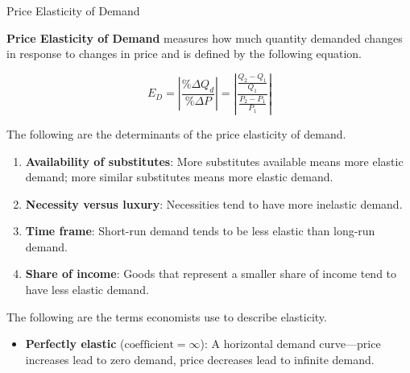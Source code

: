 \documentclass[10pt]{article}
\begin{document}
    \begin{core}{Price Elasticity of Demand}

      \textbf{Price Elasticity of Demand} measures how much quantity demanded changes in response to changes in price and is defined by the following equation.

      \[
        E_D = \left| \frac{\%\Delta Q_d}{\%\Delta P} \right| = \left| \frac{\frac{Q_2 - Q_1}{Q_1}}{\frac{P_2 - P_1}{P_1}} \right|
      \]

      The following are the determinants of the price elasticity of demand.

      \begin{enumerate}

        \item \textbf{Availability of substitutes}: More substitutes available means more elastic demand; more similar substitutes means more elastic demand.

        \item \textbf{Necessity versus luxury}: Necessities tend to have more inelastic demand.

        \item \textbf{Time frame}: Short-run demand tends to be less elastic than long-run demand.

        \item \textbf{Share of income}: Goods that represent a smaller share of income tend to have less elastic demand.

      \end{enumerate}

      The following are the terms economists use to describe elasticity.

      \begin{itemize}

        \item \textbf{Perfectly elastic} ($\text{coefficient} = ∞$): A horizontal demand curve---price increases lead to zero demand, price decreases lead to infinite demand.



\end{itemize}
\end{core}
\end{document}
